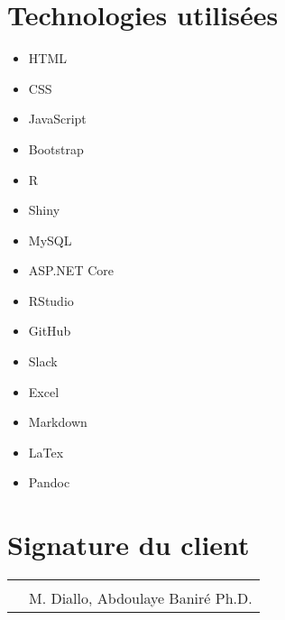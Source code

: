 \documentclass[letter,12pt]{exam}
\begin{document}
\section{Technologies utilisées}

\begin{multicols}{2}
\begin{itemize}
\tightlist
\item
  HTML
\item
  CSS
\item
  JavaScript
\item
  Bootstrap
\item
  R
\item
  Shiny
\item
  MySQL
\item
  ASP.NET Core
\item
  RStudio
\item
  GitHub
\item
  Slack
\item
  Excel
\item
  Markdown
\item
  LaTex
\item
  Pandoc
\end{itemize}
\end{multicols}

\vspace{3cm}

\section{Signature du client}

\vspace{1cm}

\begin{tabular}{@{}p{0.2cm}p{4in}@{}}
& \hrulefill \\
& M. Diallo, Abdoulaye Baniré Ph.D. \\
\end{tabular}
\end{document}
